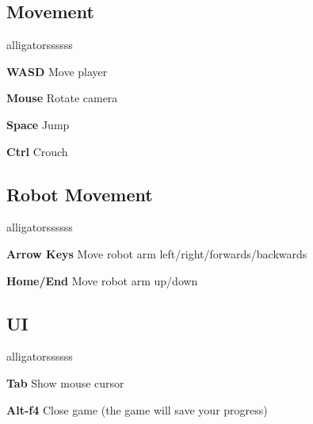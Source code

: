 \subsection{Movement}
\begin{labeling}{alligatorssssss}
	\item [\textbf{WASD}] Move player
	\item [\textbf{Mouse}] Rotate camera
	\item [\textbf{Space}] Jump
	\item [\textbf{Ctrl}] Crouch
\end{labeling}

\subsection{Robot Movement}
\begin{labeling}{alligatorssssss}
	\item [\textbf{Arrow Keys}] Move robot arm left/right/forwards/backwards
	\item [\textbf{Home/End}] Move robot arm up/down
\end{labeling}

\subsection{UI}
\begin{labeling}{alligatorssssss}
	\item [\textbf{Tab}] Show mouse cursor
	\item [\textbf{Alt-f4}] Close game (the game will save your progress)
\end{labeling}